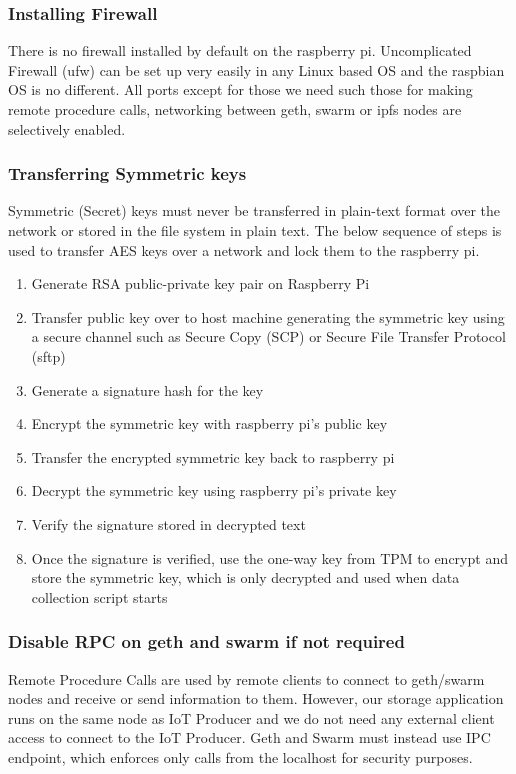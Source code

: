 \documentclass[11pt,openright]{report}
\begin{document}
\subsubsection{Installing Firewall}
There is no firewall installed by default on the raspberry pi. Uncomplicated Firewall (ufw) can be set up very easily in any Linux based OS and the raspbian OS is no different. All ports except for those we need such those for making remote procedure calls, networking between geth, swarm or ipfs nodes are selectively enabled.

\subsubsection{Transferring Symmetric keys} \label{transfer_symm_keys}
Symmetric (Secret) keys must never be transferred in plain-text format over the network or stored in the file system in plain text. The below sequence of steps is used to transfer AES keys over a network and lock them to the raspberry pi.

\begin{enumerate}
    \item Generate RSA public-private key pair on Raspberry Pi
    \item Transfer public key over to host machine generating the symmetric key using a secure channel such as Secure Copy (SCP) or Secure File Transfer Protocol (sftp)
    \item Generate a signature hash for the key
    \item Encrypt the symmetric key with raspberry pi's public key
    \item Transfer the encrypted symmetric key back to raspberry pi
    \item Decrypt the symmetric key using raspberry pi's private key
    \item Verify the signature stored in decrypted text
    \item Once the signature is verified, use the one-way key from TPM to encrypt and store the symmetric key, which is only decrypted and used when data collection script starts
\end{enumerate}

\subsubsection{Disable RPC on geth and swarm if not required}
Remote Procedure Calls are used by remote clients to connect to geth/swarm nodes and receive or send information to them. However, our storage application runs on the same node as IoT Producer and we do not need any external client access to connect to the IoT Producer. Geth and Swarm must instead use IPC endpoint, which enforces only calls from the localhost for security purposes.
\end{document}
